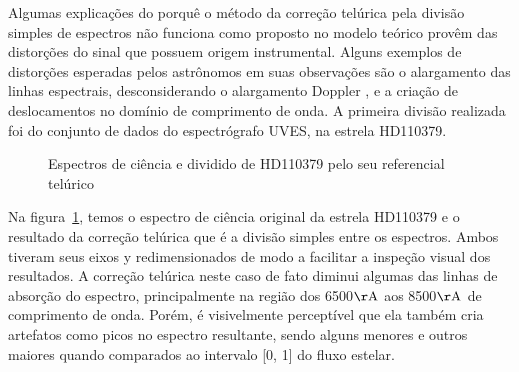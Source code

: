 Algumas explicações do porquê o método da correção telúrica pela divisão simples de espectros não funciona como proposto no modelo teórico provêm das distorções do sinal que possuem origem instrumental. Alguns exemplos de distorções esperadas pelos astrônomos em suas observações são o alargamento das linhas espectrais, desconsiderando o alargamento Doppler \citep{LEVENHAGEN2008}, e a criação de deslocamentos no domínio de comprimento de onda.
A primeira divisão realizada foi do conjunto de dados do espectrógrafo UVES, na estrela HD110379. 

\begin{figure}[htb]
  \centering
  \hfill
  \caption{Espectros de ciência e dividido de HD110379 pelo seu referencial telúrico}
  \label{fig:hd110379-division}
\end{figure}

Na figura~\ref{fig:hd110379-division}, temos o espectro de ciência original da estrela HD110379 e o resultado da correção telúrica que é a divisão simples entre os espectros. Ambos tiveram seus eixos y redimensionados de modo a facilitar a inspeção visual dos resultados.  A correção telúrica neste caso de fato diminui algumas das linhas de absorção do espectro, principalmente na região dos 6500$\mathrm{\AA}$ aos 8500$\mathrm{\AA}$ de comprimento de onda. Porém, é visivelmente perceptível que ela também cria artefatos como picos no espectro resultante, sendo alguns menores e outros maiores quando comparados ao intervalo [0, 1] do fluxo estelar.

